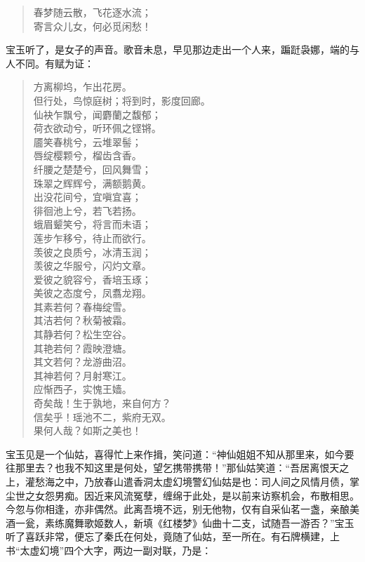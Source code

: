 \documentclass[12pt,oneside]{book}
\newenvironment{shici}{%
\begin{verse}%
\centering\large\hspace{12pt}}%
{\end{verse}}
\begin{document}
\begin{shici}
春梦随云散，飞花逐水流；\\
寄言众儿女，何必觅闲愁！
\end{shici}


宝玉听了，是女子的声音。歌音未息，早见那边走出一个人来，蹁跹袅娜，端的与人不同。有赋为证：

\begin{shici}
方离柳坞，乍出花房。\\
但行处，鸟惊庭树；将到时，影度回廊。\\
仙袂乍飘兮，闻麝蘭之馥郁；\\
荷衣欲动兮，听环佩之铿锵。\\
靥笑春桃兮，云堆翠髻；\\
唇绽樱颗兮，榴齿含香。\\
纤腰之楚楚兮，回风舞雪；\\
珠翠之辉辉兮，满额鹅黄。\\
出没花间兮，宜嗔宜喜；\\
徘徊池上兮，若飞若扬。\\
蛾眉颦笑兮，将言而未语；\\
莲步乍移兮，待止而欲行。\\
羡彼之良质兮，冰清玉润；\\
羡彼之华服兮，闪灼文章。\\
爱彼之貌容兮，香培玉琢；\\
美彼之态度兮，凤翥龙翔。\\
其素若何？春梅绽雪。\\
其洁若何？秋菊被霜。\\
其静若何？松生空谷。\\
其艳若何？霞映澄塘。\\
其文若何？龙游曲沼。\\
其神若何？月射寒江。\\
应惭西子，实愧王嫱。\\
奇矣哉！生于孰地，来自何方？\\
信矣乎！瑶池不二，紫府无双。\\
果何人哉？如斯之美也！
\end{shici}


宝玉见是一个仙姑，喜得忙上来作揖，笑问道：“神仙姐姐不知从那里来，如今要往那里去？也我不知这里是何处，望乞携带携带！”那仙姑笑道：“吾居离恨天之上，灌愁海之中，乃放春山遣香洞太虚幻境警幻仙姑是也：司人间之风情月债，掌尘世之女怨男痴。因近来风流冤孽，缠绵于此处，是以前来访察机会，布散相思。今忽与你相逢，亦非偶然。此离吾境不远，别无他物，仅有自采仙茗一盏，亲酿美酒一瓮，素练魔舞歌姬数人，新填《红楼梦》仙曲十二支，试随吾一游否？”宝玉听了喜跃非常，便忘了秦氏在何处，竟随了仙姑，至一所在。有石牌横建，上书“太虚幻境”四个大字，两边一副对联，乃是：
\end{document}
